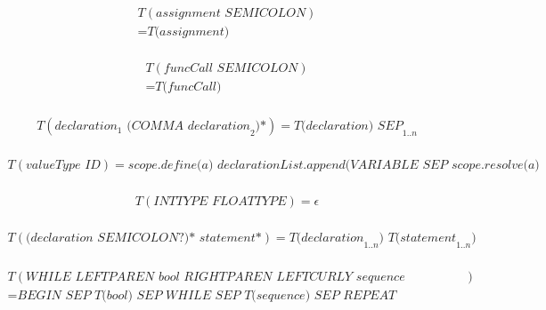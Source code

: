\documentclass[a4paper,12pt]{article}
\begin{document}
\begin{landscape}
\begin{equation} 
\begin{aligned}
    T( \textit{assignment SEMICOLON})\\
    = \textit{T(assignment)} \\
\end{aligned}
\end{equation}

\begin{equation} 
\begin{aligned}
    T( \textit{funcCall SEMICOLON})\\
    = \textit{T(funcCall)} \\
\end{aligned}
\end{equation}

\begin{equation} 
\begin{aligned}
    T( \textit{declaration}_{1} \textit{ (COMMA declaration}_{2} \textit{)*}) = \textit{T(declaration) SEP}_{1..n}\\
\end{aligned}
\end{equation}

\begin{equation} 
\begin{aligned}
    T( \textit{valueType ID}) = \textit{scope.define(a) declarationList.append(VARIABLE SEP scope.resolve(a)} \\
\end{aligned}
\end{equation}

\begin{equation} 
\begin{aligned}
    T( \textit{INTTYPE FLOATTYPE}) = \epsilon \\
\end{aligned}
\end{equation}

\begin{equation} 
\begin{aligned}
    T( \textit{(declaration SEMICOLON?)* statement*}) = \textit{T(declaration}_{1..n} \textit{) T(statement}_{1..n} \textit{)}\\
\end{aligned}
\end{equation}

\begin{equation} 
\begin{aligned}
    T( \textit{WHILE LEFTPAREN bool RIGHTPAREN LEFTCURLY sequence RIGHTCURLY})\\
    = \textit{BEGIN SEP T(bool) SEP WHILE SEP T(sequence) SEP REPEAT} \\
\end{aligned}
\end{equation}


\end{landscape}
\end{document}
